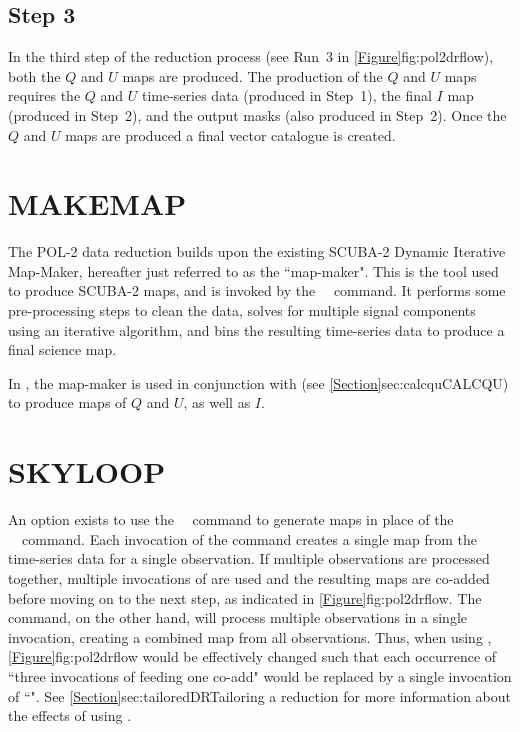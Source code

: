 \subsection*{Step 3}

In the third step of the reduction process (see Run~3 in
\cref{Figure}{fig:pol2drflow}{}), both the $Q$ and $U$ maps are produced. The production
of the $Q$ and $U$ maps requires the $Q$ and $U$ time-series data (produced in
Step~1), the final $I$ map (produced in Step~2), and the output masks (also
produced in Step~2). Once the $Q$ and $U$ maps are produced a final vector
catalogue is created.

\section{MAKEMAP}

The POL-2 data reduction builds upon the existing SCUBA-2 Dynamic
Iterative Map-Maker, hereafter just referred to as the ``map-maker". This
is the tool used to produce SCUBA-2 maps, and is invoked by the
\SMURF\ \makemap\ command. It performs some
pre-processing steps to clean the data, solves for multiple signal
components using an iterative algorithm, and bins the resulting
time-series data to produce a final science map.

In \poltwomap, the map-maker is used in conjunction with
 (see
\cref{Section}{sec:calcqu}{CALCQU}) to produce maps of $Q$ and $U$, as well as $I$.

\section{SKYLOOP}
\label{sec:skyloop}

An option exists to use the \SMURF\ \skyloop\  command to generate maps
in place of the \SMURF\ \makemap\ command. Each invocation of the
 command creates a single map from the time-series data
for a single observation. If multiple observations are processed together,
multiple invocations of  are used and the resulting maps are
co-added before moving on to the next step, as indicated in
\cref{Figure}{fig:pol2drflow}{}. The  command, on the other hand,
will process multiple observations in a single invocation, creating a combined
map from all observations. Thus, when using ,
\cref{Figure}{fig:pol2drflow}{} would be effectively changed such that each occurrence
of ``three invocations of  feeding one co-add" would be replaced
by a single invocation of ``". See
\cref{Section}{sec:tailoredDR}{Tailoring a reduction}
for more information about the effects of using .

